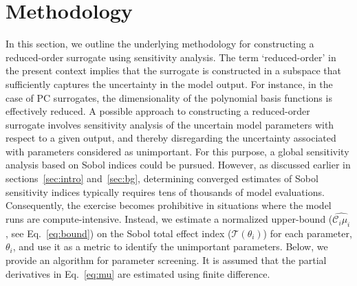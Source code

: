 \section{Methodology}
\label{sec:method}

%

In this section, we outline the underlying methodology for constructing a 
reduced-order surrogate using sensitivity analysis. The term `reduced-order'
in the present context implies that the surrogate is constructed in a 
subspace that sufficiently captures the uncertainty in the model output. 
For instance, in the case of PC surrogates, the dimensionality of the polynomial
basis functions is effectively reduced. A possible approach to 
constructing a reduced-order surrogate involves sensitivity analysis of the
uncertain model parameters with respect to a given output, and thereby
disregarding the uncertainty associated with parameters considered as unimportant.
For this purpose, a global sensitivity analysis based on Sobol indices could be pursued.
However, as discussed earlier in sections~\ref{sec:intro} and~\ref{sec:bg}, determining converged 
estimates of Sobol sensitivity indices typically requires tens of thousands
of model evaluations. Consequently, the exercise becomes prohibitive in
situations where the model runs are compute-intensive. Instead, we estimate a normalized
upper-bound ($\widehat{\mathcal{C}_i\mu_i}$, see Eq.~\ref{eq:bound}) on the Sobol total
effect index ($\mathcal{T}(\theta_i)$) for each parameter, $\theta_i$, and use it as a 
metric to identify the unimportant parameters. Below, we provide an algorithm for 
parameter screening. It is assumed that the partial derivatives in Eq.~\ref{eq:mu}
are estimated using finite difference. 


